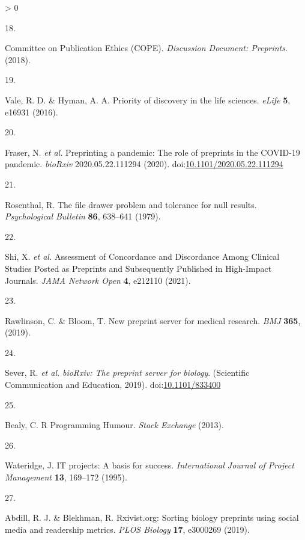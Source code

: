 \documentclass[a4paper, twoside]{templates/ociamthesis}
\newlength{\cslhangindent}
\newlength{\csllabelwidth}
\newenvironment{CSLReferences}[3] %
 {%
  \setlength{\parindent}{0pt}
  \ifodd #1 \everypar{\setlength{\hangindent}{\cslhangindent}}\ignorespaces\fi
  \ifnum #2 > 0
  \setlength{\parskip}{#2\baselineskip}
  \fi
 }%
 {}
\newcommand{\CSLLeftMargin}[1]{\parbox[t]{\maxof{\widthof{#1}}{\csllabelwidth}}{#1}}
\newcommand{\CSLRightInline}[1]{\parbox[t]{\linewidth - \csllabelwidth}{#1}}
\begin{document}
\begin{CSLReferences}{0}{0}
\leavevmode\hypertarget{ref-committeeonpublicationethicscope2018}{}%
\CSLLeftMargin{18. }
\CSLRightInline{Committee on Publication Ethics (COPE). \emph{Discussion {Document}: {Preprints}}. (2018).}

\leavevmode\hypertarget{ref-vale2016}{}%
\CSLLeftMargin{19. }
\CSLRightInline{Vale, R. D. \& Hyman, A. A. Priority of discovery in the life sciences. \emph{eLife} \textbf{5}, e16931 (2016).}

\leavevmode\hypertarget{ref-fraser2020a}{}%
\CSLLeftMargin{20. }
\CSLRightInline{Fraser, N. \emph{et al.} Preprinting a pandemic: The role of preprints in the {COVID}-19 pandemic. \emph{bioRxiv} 2020.05.22.111294 (2020). doi:\href{https://doi.org/10.1101/2020.05.22.111294}{10.1101/2020.05.22.111294}}

\leavevmode\hypertarget{ref-rosenthal1979}{}%
\CSLLeftMargin{21. }
\CSLRightInline{Rosenthal, R. The file drawer problem and tolerance for null results. \emph{Psychological Bulletin} \textbf{86}, 638--641 (1979).}

\leavevmode\hypertarget{ref-shi2021a}{}%
\CSLLeftMargin{22. }
\CSLRightInline{Shi, X. \emph{et al.} Assessment of {Concordance} and {Discordance Among Clinical Studies Posted} as {Preprints} and {Subsequently Published} in {High}-{Impact Journals}. \emph{JAMA Network Open} \textbf{4}, e212110 (2021).}

\leavevmode\hypertarget{ref-rawlinson2019}{}%
\CSLLeftMargin{23. }
\CSLRightInline{Rawlinson, C. \& Bloom, T. New preprint server for medical research. \emph{BMJ} \textbf{365}, (2019).}

\leavevmode\hypertarget{ref-sever2019}{}%
\CSLLeftMargin{24. }
\CSLRightInline{Sever, R. \emph{et al.} \emph{{bioRxiv}: The preprint server for biology}. ({Scientific Communication and Education}, 2019). doi:\href{https://doi.org/10.1101/833400}{10.1101/833400}}

\leavevmode\hypertarget{ref-bealy2013}{}%
\CSLLeftMargin{25. }
\CSLRightInline{Bealy, C. R {Programming Humour}. \emph{Stack Exchange} (2013).}

\leavevmode\hypertarget{ref-wateridge1995}{}%
\CSLLeftMargin{26. }
\CSLRightInline{Wateridge, J. {IT} projects: A basis for success. \emph{International Journal of Project Management} \textbf{13}, 169--172 (1995).}

\leavevmode\hypertarget{ref-abdill2019}{}%
\CSLLeftMargin{27. }
\CSLRightInline{Abdill, R. J. \& Blekhman, R. Rxivist.org: {Sorting} biology preprints using social media and readership metrics. \emph{PLOS Biology} \textbf{17}, e3000269 (2019).}


\end{CSLReferences}
\end{document}
